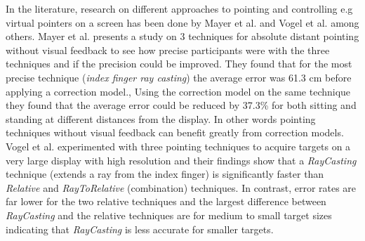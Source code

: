 
In the literature, research on different approaches to pointing and controlling e.g virtual pointers on a screen  has been done by Mayer et al. and Vogel et al. among others.
Mayer et al. presents a study on 3 techniques for absolute distant pointing without visual feedback to see how precise participants were with the three techniques and if the precision could be improved.
They found that for the most precise technique (\emph{index finger ray casting}) the average error was 61.3 cm before applying a correction model.,
Using the correction model on the same technique they found that the average error could be reduced by 37.3\% for both sitting and standing at different distances from the display.
In other words pointing techniques without visual feedback can benefit greatly from correction models.
Vogel et al. experimented with three pointing techniques to acquire targets on a very large display with high resolution and their findings show that a \emph{RayCasting} technique (extends a ray from the index finger) is significantly faster than \emph{Relative} and \emph{RayToRelative} (combination) techniques.
In contrast, error rates are far lower for the two relative techniques and the largest difference between \emph{RayCasting} and the relative techniques are for medium to small target sizes indicating that \emph{RayCasting} is less accurate for smaller targets.
